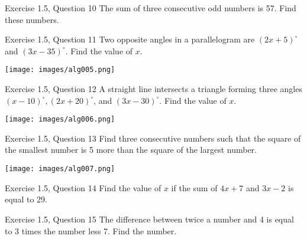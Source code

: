 \documentclass[leqno,usenames,dvipsnames,14pt]{beamer}
\begin{document}
\begin{frame}{Exercise 1.5, Question 10}
\Large
  The sum of three consecutive odd numbers is 57. Find these numbers.
\end{frame}

\begin{frame}{Exercise 1.5, Question 11}
\Large
  Two opposite angles in a parallelogram are \( (2x + 5)^\circ \) and \( (3x - 35)^\circ \). Find the value of \( x \).

  \begin{center}
    \texttt{[image: images/alg005.png]}
  \end{center}
\end{frame}

\begin{frame}{Exercise 1.5, Question 12}
\Large
  A straight line intersects a triangle forming three angles \( (x - 10)^\circ, (2x + 20)^\circ \), and \( (3x - 30)^\circ \). Find the value of \( x \).

  \begin{center}
    \texttt{[image: images/alg006.png]}
  \end{center}
\end{frame}

\begin{frame}{Exercise 1.5, Question 13}
\Large
  Find three consecutive numbers such that the square of the smallest number is 5 more than the square of the largest number.

  \begin{center}
    \texttt{[image: images/alg007.png]}
  \end{center}
\end{frame}

\begin{frame}{Exercise 1.5, Question 14}
\Large
  Find the value of \( x \) if the sum of \( 4x + 7 \) and \( 3x - 2 \) is equal to 29.
\end{frame}

\begin{frame}{Exercise 1.5, Question 15}
\Large
  The difference between twice a number and 4 is equal to 3 times the number less 7. Find the number.
\end{frame}
\end{document}
